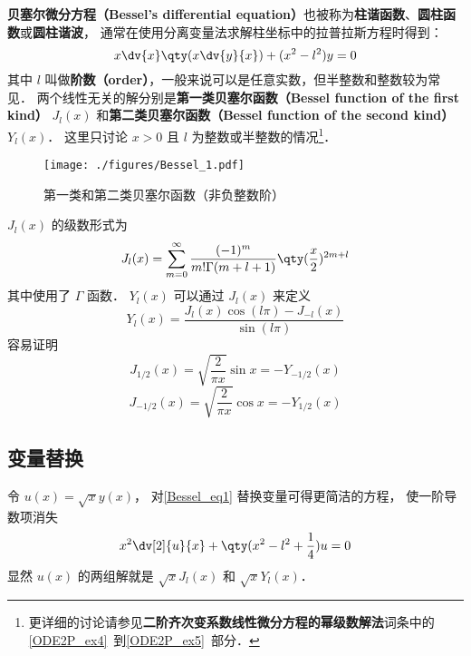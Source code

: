 

\textbf{贝塞尔微分方程（Bessel's differential equation）}也被称为\textbf{柱谐函数}、\textbf{圆柱函数}或\textbf{圆柱谐波}， 通常在使用分离变量法求解柱坐标中的拉普拉斯方程时得到：
\begin{equation}\label{Bessel_eq1}
x\dv{x}\qty(x\dv{y}{x}) + (x^2 - l ^2)y = 0
\end{equation}
其中 $l$ 叫做\textbf{阶数（order）}，一般来说可以是任意实数，但半整数和整数较为常见． 两个线性无关的解分别是\textbf{第一类贝塞尔函数（Bessel function of the first kind）} $J_l(x)$ 和\textbf{第二类贝塞尔函数（Bessel function of the second kind）} $Y_l(x)$． 这里只讨论 $x > 0$ 且 $l$ 为整数或半整数的情况\footnote{更详细的讨论请参见\textbf{二阶齐次变系数线性微分方程的幂级数解法}词条中的\autoref{ODE2P_ex4}~到\autoref{ODE2P_ex5}~部分．}．

\begin{figure}[ht]
\centering
\texttt{[image: ./figures/Bessel\_1.pdf]}
\caption{第一类和第二类贝塞尔函数（非负整数阶）} \label{Bessel_fig1}
\end{figure}

$J_l(x)$ 的级数形式为
\begin{equation}\label{Bessel_eq3}
J_l(x) = \sum_{m=0}^\infty \frac{(-1)^m}{m!\Gamma(m+l+1)} \qty(\frac x2)^{2m+l}
\end{equation}
其中使用了 $\Gamma$ 函数． $Y_l(x)$ 可以通过 $J_l(x)$ 来定义
\begin{equation}
Y_l(x) = \frac{J_l(x)\cos(l\pi) - J_{-l}(x)}{\sin(l\pi)}
\end{equation}
容易证明
\begin{equation}
J_{1/2}(x) = \sqrt{\frac{2}{\pi x}} \sin x = -Y_{-1/2}(x)
\end{equation}
\begin{equation}
J_{-1/2}(x) = \sqrt{\frac{2}{\pi x}} \cos x = -Y_{1/2}(x)
\end{equation}

\subsection{变量替换}
令 $u(x) = \sqrt{x} y(x)$， 对\autoref{Bessel_eq1} 替换变量可得更简洁的方程， 使一阶导数项消失
\begin{equation}
x^2\dv[2]{u}{x} + \qty(x^2 - l^2 + \frac{1}{4}) u = 0
\end{equation}
显然 $u(x)$ 的两组解就是 $\sqrt{x}J_l(x)$ 和 $\sqrt{x}Y_l(x)$．

